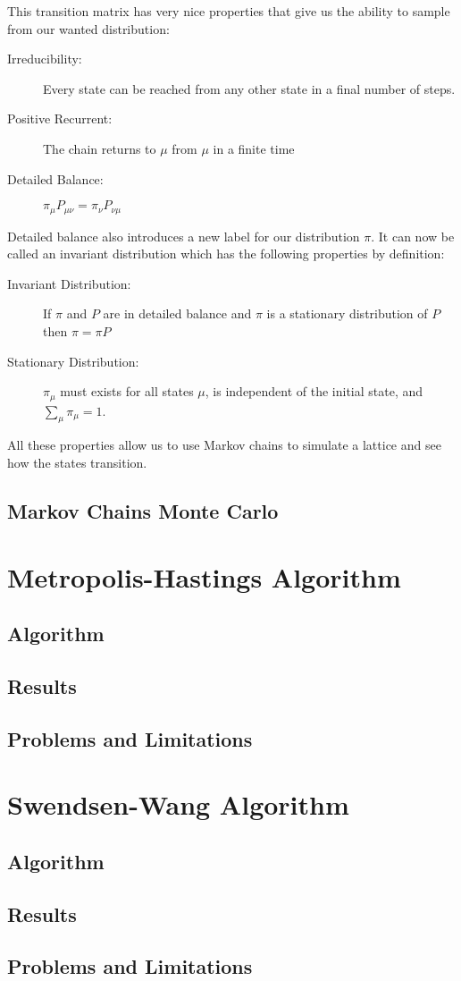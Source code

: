 \documentclass[a4]{scrartcl}
\begin{document}
This transition matrix has very nice properties that give us the ability to sample from our wanted distribution:
\begin{description}
	\item[Irreducibility:] Every state can be reached from any other state in a final number of steps.
	\item[Positive Recurrent:] The chain returns to $\mu$ from $\mu$ in a finite time
	\item[Detailed Balance:] $ \pi_\mu P_{\mu \nu} = \pi_\nu P_{\nu \mu} $
\end{description}
Detailed balance also introduces a new label for our distribution $\pi$. It can now be called an invariant distribution which has the following properties by definition:
\begin{description}
	\item[Invariant Distribution:] If $\pi$ and $P$ are in detailed balance and $\pi$ is a stationary distribution of $P$ then $\pi = \pi P$
	\item[Stationary Distribution:] $\pi_\mu$ must exists for all states $\mu$, is independent of the initial state, and $ \sum_\mu \pi_\mu = 1 $. 
\end{description}

All these properties allow us to use Markov chains to simulate a lattice and see how the states transition. 
\subsection{Markov Chains Monte Carlo}
	

\section{Metropolis-Hastings Algorithm}
\subsection{Algorithm}

\subsection{Results}

\subsection{Problems and Limitations}

\section{Swendsen-Wang Algorithm}
\subsection{Algorithm}

\subsection{Results}

\subsection{Problems and Limitations}

\appendix
\end{document}
